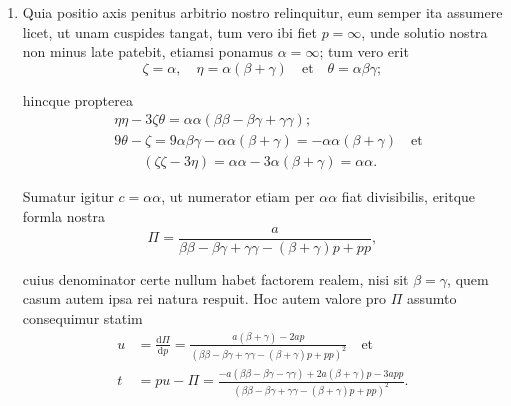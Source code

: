 \documentclass[10pt,a4paper]{article}
\def\D{\mathrm{d}}
\begin{document}
\begin{paracol}{2}
\begin{enumerate}[topsep=1px]
		\item Quia positio axis penitus arbitrio nostro relinquitur, eum semper ita assumere licet, ut unam cuspides tangat, tum vero ibi fiet $p=\infty$, unde solutio nostra non minus late patebit, etiamsi ponamus $\alpha = \infty$; tum vero erit
		\[
			\zeta = \alpha, \quad \eta = \alpha(\beta+ \gamma)\quad \text{et}\quad  \theta = \alpha \beta \gamma;
		\]
		\par hincque propterea
		\begin{align*}
			&\eta \eta - 3\zeta \theta = \alpha \alpha (\beta \beta - \beta \gamma + \gamma \gamma);\\
			&9\theta - \zeta = 9\alpha \beta \gamma - \alpha \alpha(\beta + \gamma) = - \alpha \alpha (\beta + \gamma)\quad \text{et}\\
			&\qquad (\zeta \zeta - 3\eta) = \alpha \alpha - 3\alpha (\beta + \gamma) = \alpha \alpha.
		\end{align*}
		\par Sumatur igitur $c= \alpha \alpha$, ut numerator etiam per $\alpha \alpha$ fiat divisibilis, eritque formla nostra
		\[
			\Pi = \frac{a}{\beta \beta -\beta \gamma+\gamma \gamma -(\beta + \gamma)p + pp},
		\]
		\par cuius denominator certe nullum habet factorem realem, nisi sit $\beta = \gamma$, quem casum autem ipsa rei natura respuit. Hoc autem valore pro $\Pi$ assumto consequimur statim
		\begin{align*}
			u &= \frac{\D \Pi}{\D p} = \frac{a(\beta + \gamma)-2ap}{(\beta \beta -\beta \gamma +\gamma \gamma - (\beta+\gamma)p+pp)^2} \quad \text{et}\\
			t & = pu - \Pi = \frac{-a(\beta \beta - \beta \gamma-\gamma \gamma)+2a(\beta+\gamma)p -3app}{(\beta \beta - \beta \gamma + \gamma \gamma -(\beta + \gamma)p+pp)^2}.
		\end{align*}
		

\end{enumerate}
\end{paracol}
\end{document}
